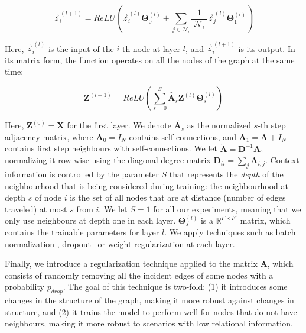 \documentclass[10pt,twocolumn,letterpaper]{article}
\begin{document}
\begin{equation}
    \vec{z}_i^{\,(l+1)} = ReLU \left( \vec{z}_i^{\,(l)} \boldsymbol{\Theta}_0^{(l)} + \sum_{j \in \mathcal{N}_i} \frac{1}{|\mathcal{N}_i|} \vec{z}_j^{\,(l)} \boldsymbol{\Theta}_1^{(l)} \right)
    \label{eq:fneigh}
\end{equation}

Here, $\vec{z}_i^{\,(l)}$ is the input of the $i$-th node at layer $l$, and $\vec{z}_i^{\,(l+1)}$ is its output.
In its matrix form, the function operates on all the nodes of the graph at the same time:

\begin{equation}
    \boldsymbol{Z}^{(l+1)} = ReLU \left( \sum_{s=0}^S \tilde{\boldsymbol{A}_s}\boldsymbol{Z}^{(l)}\boldsymbol{\Theta}_s^{(l)} \right)
    \label{eq:gconv}
\end{equation}

Here, $\boldsymbol{Z}^{(0)} = \boldsymbol{X}$ for the first layer. We denote $\tilde{\boldsymbol{A}_s}$ as the normalized $s$-{th} step adjacency matrix, where $\boldsymbol{A}_0 = I_N$ contains self-connections, and $\boldsymbol{A}_1 = \boldsymbol{A} + I_N$ contains first step neighbours with self-connections. We let $\boldsymbol{\tilde{A}} = \boldsymbol{D}^{-1}\boldsymbol{A}$, normalizing it row-wise using the diagonal degree matrix $\boldsymbol{D}_{ii} = \sum_j \boldsymbol{A}_{i,j}$. 
Context information is controlled by the parameter $S$ that represents the \emph{depth} of the neighbourhood that is being considered during training: the neighbourhood at depth $s$ of node $i$ is the set of all nodes that are at distance (number of edges traveled) at most $s$ from $i$. We let $S=1$ for all our experiments, meaning that we only use neighbours at depth one in each layer. $\boldsymbol{\Theta}_s^{(l)}$ is a $\mathbb{R}^{F \times F'}$ matrix, which contains the trainable parameters for layer $l$. 
We apply techniques such as batch normalization \cite{ioffe2015batch}, dropout~\cite{srivastava2014dropout} or weight regularization at each layer.

Finally, we introduce a regularization technique applied to the matrix $\boldsymbol{A}$, which consists of randomly removing all the incident edges of some nodes with a probability $p_{drop}$. The goal of this technique is two-fold: (1) it introduces some changes in the structure of the graph, making it more robust against changes in structure, and (2) it trains the model to perform well for nodes that do not have neighbours, making it more robust to scenarios with low relational information. 
\end{document}
